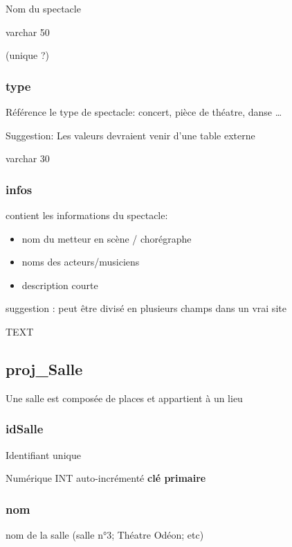 Nom du spectacle

varchar 50

(unique ?)

\subsubsection{type}\label{type}

Référence le type de spectacle: concert, pièce de théatre, danse
\ldots{}

Suggestion: Les valeurs devraient venir d'une table externe

varchar 30

\subsubsection{infos}\label{infos}

contient les informations du spectacle:

\begin{itemize}
\tightlist
\item
  nom du metteur en scène / chorégraphe
\item
  noms des acteurs/musiciens
\item
  description courte
\end{itemize}

suggestion : peut être divisé en plusieurs champs dans un vrai site

TEXT

\subsection{proj\_Salle}\label{projux5fsalle}

Une salle est composée de places et appartient à un lieu

\subsubsection{\texorpdfstring{\textbf{idSalle}}{idSalle}}\label{idsalle}

Identifiant unique

Numérique INT auto-incrémenté \textbf{clé primaire}

\subsubsection{nom}\label{nom-2}

nom de la salle (salle n°3; Théatre Odéon; etc)

